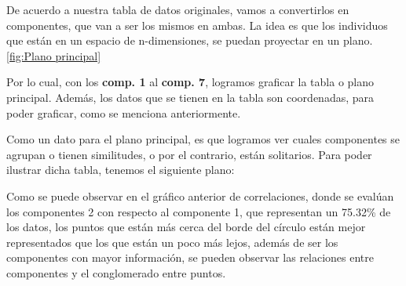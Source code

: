 De acuerdo a nuestra tabla de datos originales, vamos a convertirlos en componentes, que van a ser los mismos en ambas. La idea es que los individuos que están en un espacio de n-dimensiones, se puedan proyectar en un plano. \ref{fig:Plano principal} 

Por lo cual, con los \textbf{comp. 1} al \textbf{comp. 7}, logramos graficar la tabla o plano principal. Además, los datos que se tienen en la tabla son coordenadas, para poder graficar, como se menciona anteriormente. 

Como un dato para el plano principal, es que logramos ver cuales componentes se agrupan o tienen similitudes, o por el contrario, están solitarios. Para poder ilustrar dicha tabla, tenemos el siguiente plano:


Como se puede observar en el gráfico anterior de correlaciones, donde se evalúan los componentes 2 con respecto al componente 1, que representan un 75.32\% de los datos, los puntos que están más cerca del borde del círculo están mejor representados que los que están un poco más lejos, además de ser los componentes con mayor información, se pueden observar las relaciones entre componentes y el conglomerado entre puntos.  



